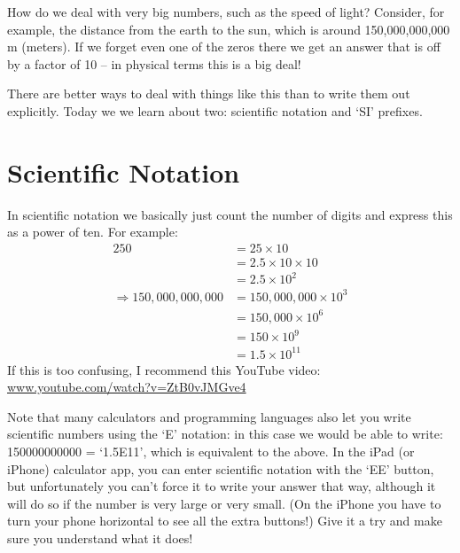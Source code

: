 \documentclass[12pt, letterpaper]{article}
\begin{document}

How do we deal with very big numbers, such as the speed of light?
Consider, for example, the distance from the earth to the sun, which is around 150,000,000,000 m (meters).
If we forget even one of the zeros there we get an answer that is off by a factor of 10 -- in physical terms this is a big deal!

There are better ways to deal with things like this than to write them out explicitly.
Today we we learn about two: scientific notation and `SI' prefixes.

\section{Scientific Notation}
In scientific notation we basically just count the number of digits and express this as a power of ten.
For example:
\begin{align}
	250 &= 25 \times 10\\
	&= 2.5 \times 10 \times 10\\
	&= 2.5 \times 10^2\\
	\Rightarrow 150,000,000,000 &= 150,000,000 \times 10^3\\
	&= 150,000 \times 10^6 \\
	&= 150 \times 10^9 \\
	&= 1.5 \times 10^{11}
\end{align}
If this is too confusing, I recommend this YouTube video:\\ \href{https://www.youtube.com/watch?v=ZtB0vJMGve4}{www.youtube.com/watch?v=ZtB0vJMGve4}

Note that many calculators and programming languages also let you write scientific numbers using the `E' notation: in this case we would be able to write: 150000000000 = `1.5E11', which is equivalent to the above.
In the iPad (or iPhone) calculator app, you can enter scientific notation with the `EE' button, but unfortunately you can't force it to write your answer that way, although it will do so if the number is very large or very small.
(On the iPhone you have to turn your phone horizontal to see all the extra buttons!)
Give it a try and make sure you understand what it does!
\end{document}

